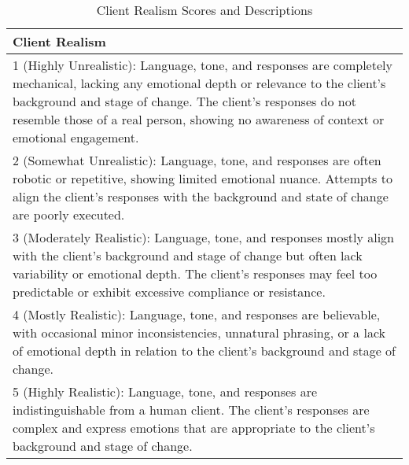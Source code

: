 \begin{table*}[tb]
\begin{tabularx}{\textwidth}{X}
\toprule
\textbf{Client Realism} \\ \midrule
1 (Highly Unrealistic): Language, tone, and responses are completely mechanical, lacking any emotional depth or relevance to the client's background and stage of change. The client's responses do not resemble those of a real person, showing no awareness of context or emotional engagement.                  \\
2 (Somewhat Unrealistic): Language, tone, and responses are often robotic or repetitive, showing limited emotional nuance. Attempts to align the client's responses with the background and state of change are poorly executed.      \\
3 (Moderately Realistic): Language, tone, and responses mostly align with the client's background and stage of change but often lack variability or emotional depth. The client's responses may feel too predictable or exhibit excessive compliance or resistance. \\
4 (Mostly Realistic): Language, tone, and responses are believable, with occasional minor inconsistencies, unnatural phrasing, or a lack of emotional depth in relation to the client's background and stage of change. \\
5 (Highly Realistic): Language, tone, and responses are indistinguishable from a human client. The client's responses are complex and express emotions that are appropriate to the client's background and stage of change. \\
\bottomrule                            
\end{tabularx}
\caption{Client Realism Scores and Descriptions}
\label{tab:client realism}
\end{table*}


